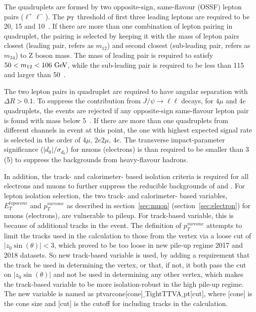 The \llll quadruplets are formed by two opposite-sign, same-flavour (OSSF) lepton pairs ($\ell^{+}\ell^{-}$).
The $p_{\text{T}}$ threshold of first three leading leptons are required to be 20, 15 and 10~\gev.
If there are more than one combination of lepton pairing in quadruplet, the pairing is selected by keeping it with the mass of lepton pairs closest (leading pair, refers as $m_{12}$) and second closest (sub-leading pair, refers as $m_{34}$) to Z boson mass.
The mass of leading pair is required to satisfy $50 < m_{12} < 106~\text{Ge\kern -0.1em V}$, while the sub-leading pair is required to be less than 115~\gev~ and larger than 50~\gev. 

The two lepton pairs in quadruplet are required to have angular separation with $\Delta R > 0.1$.
To suppress the contribution from $J/\psi \rightarrow \ell\ell$ decays, for $4\mu$ and $4e$ quadruplets, the events are rejected if any opposite-sign same-flavour lepton pair is found with mass below 5~\gev.
If there are more than one quadruplets from different channels in event at this point, the one with highest expected signal rate is selected in the order of $4\mu$, $2e2\mu$, $4e$.
The transverse impact-parameter significance ($|d_0|/\sigma_{d_0}$) for muons (electrons) is than required to be smaller than 3 (5) to suppress the backgrounds from heavy-flavour hadrons.

In addition, the track- and calorimeter- based isolation criteria is required for all electrons and muons to further suppress the reducible backgrounds of \Zjet and \ttbar.
For lepton isolation selection, the two track- and calorimeter- based variables, $E_{T}^{topocone}$ and $p_{T}^{varcone}$ as described in section~\ref{sec:muon} (section~\ref{sec:electron}) for muons (electrons), are vulnerable to pileup.
For track-based variable, this is because of additional tracks in the event.
The definition of $p_{T}^{varcone}$ attempts to limit the tracks used in the calculation to those from the vertex via a loose cut of $|z_0\sin(\theta)| < 3$,
which proved to be too loose in new pile-up regime 2017 and 2018 datasets.
So new track-based variable is used, 
by adding a requirement that the track be used in determining the vertex, or that, if not, it both pass the cut on $|z_0\sin(\theta)|$ and not be used in determining any other vertex,
which makes the track-based variable to be more isolation-robust in the high pile-up regime.
The new variable is named as ptvarcone[cone]$\_$TightTTVA$\_$pt[\pt cut], where [cone] is the cone size and [\pt cut] is the cutoff for including tracks in the calculation.

